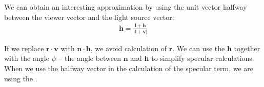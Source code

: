 \documentclass[../COS3712_Notes.tex]{subfiles}
\begin{document}
        We can obtain an interesting approximation by using the unit vector halfway
        between the viewer vector and the light source vector:
        \begin{align*}
          \mathbf{h} = \frac{\mathbf{l} + \mathbf{h}}{\lvert \mathbf{l} + \mathbf{v} \rvert}
        \end{align*}

        If we replace $\mathbf{r} \cdot \mathbf{v}$ with $\mathbf{n} \cdot \mathbf{h}$,
        we avoid calculation of $\mathbf{r}$.
        We can use the  $\mathbf{h}$ together with the angle $\psi$
        -- the angle between $\mathbf{n}$ and $\mathbf{h}$ to simplify specular calculations.
        When we use the halfway vector in the calculation of the specular term,
        we are using the .
\end{document}

